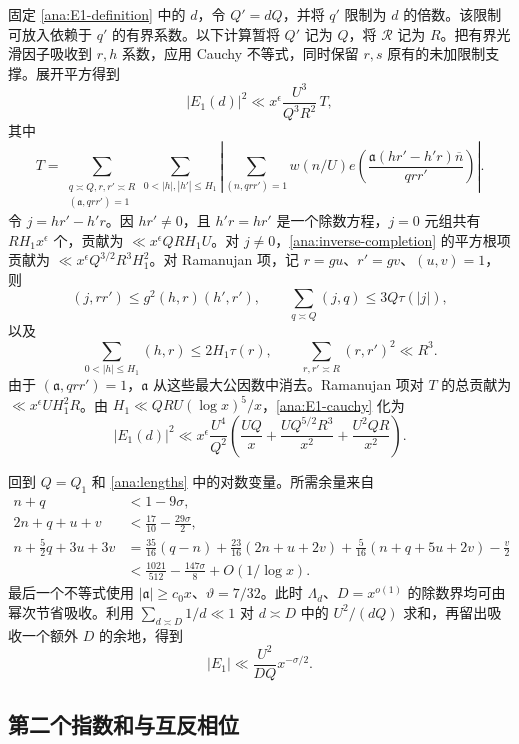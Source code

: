 固定 \eqref{ana:E1-definition} 中的 $d$，令 $Q'=dQ$，并将 $q'$ 限制为 $d$ 的倍数。该限制可放入依赖于 $q'$ 的有界系数。以下计算暂将 $Q'$ 记为 $Q$，将 $\mathcal R$ 记为 $R$。把有界光滑因子吸收到 $r,h$ 系数，应用 Cauchy 不等式，同时保留 $r,s$ 原有的未加限制支撑。展开平方得到
\begin{equation}
 |E_1(d)|^2\ll x^\epsilon\frac{U^3}{Q^3R^2}\,T,
 \label{ana:E1-cauchy}
\end{equation}
其中
\[
 T=\sum_{\substack{q\asymp Q, r,r'\asymp R\\(\mathfrak{a},qrr')=1}}
       \sum_{0<|h|,|h'|\le H_1}
 \left|\sum_{(n,qrr')=1}w(n/U)
 e\left(\frac{\mathfrak{a}(hr'-h'r)\overline n}{qrr'}\right)\right|.
\]
令 $j=hr'-h'r$。因 $hr'\ne0$，且 $h'r=hr'$ 是一个除数方程，$j=0$ 元组共有 $RH_1x^\epsilon$ 个，贡献为 $\ll x^\epsilon QRH_1U$。对 $j\ne0$，\eqref{ana:inverse-completion} 的平方根项贡献为 $\ll x^\epsilon Q^{3/2}R^3H_1^2$。对 Ramanujan 项，记 $r=gu$、$r'=gv$、$(u,v)=1$，则
\[
 (j,rr')\le g^2(h,r)(h',r'),\qquad
 \sum_{q\asymp Q}(j,q)\le3Q\tau(|j|),
\]
以及
\[
 \sum_{0<|h|\le H_1}(h,r)\le2H_1\tau(r),\qquad
 \sum_{r,r'\asymp R}(r,r')^2\ll R^3.
\]
由于 $(\mathfrak{a},qrr')=1$，$\mathfrak{a}$ 从这些最大公因数中消去。Ramanujan 项对 $T$ 的总贡献为 $\ll x^\epsilon UH_1^2R$。由 $H_1\ll QRU(\log x)^5/x$，\eqref{ana:E1-cauchy} 化为
\begin{equation}
 |E_1(d)|^2\ll x^\epsilon\frac{U^4}{Q^2}
  \left(\frac{UQ}{x}+\frac{UQ^{5/2}R^3}{x^2}
                         +\frac{U^2QR}{x^2}\right).
 \label{ana:E1-polynomial}
\end{equation}

回到 $Q=Q_1$ 和 \eqref{ana:lengths} 中的对数变量。所需余量来自
\begin{align*}
 n+q&<1-9\sigma,\\
 2n+q+u+v&<\frac{17}{10}-\frac{29\sigma}2,\\
 n+\frac52q+3u+3v
 &=\frac{35}{16}(q-n)+\frac{23}{16}(2n+u+2v)
   +\frac5{16}(n+q+5u+2v)-\frac v2\\
 &<\frac{1021}{512}-\frac{147\sigma}{8}+O(1/\log x).
\end{align*}
最后一个不等式使用 $|\mathfrak{a}|\ge c_0x$、$\vartheta=7/32$。此时 $\Lambda_d$、$D=x^{o(1)}$ 的除数界均可由幂次节省吸收。利用 $\sum_{d\asymp D}1/d\ll1$ 对 $d\asymp D$ 中的 $U^2/(dQ)$ 求和，再留出吸收一个额外 $D$ 的余地，得到
\begin{equation}
 |E_1|\ll\frac{U^2}{DQ}x^{-\sigma/2}.
 \label{ana:E1-final}
\end{equation}

\subsection{第二个指数和与互反相位}


